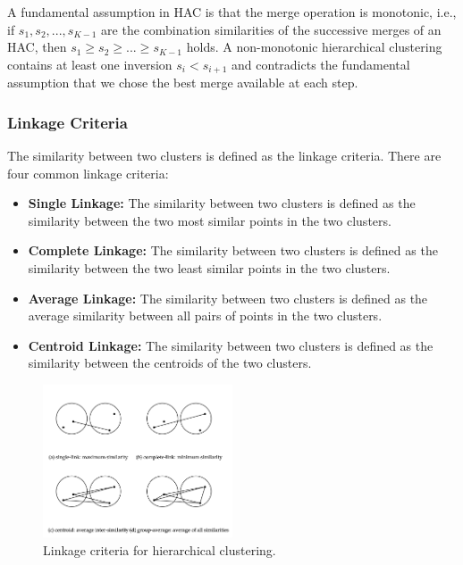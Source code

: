 \documentclass[conference]{IEEEtran}
\begin{document}
A fundamental assumption in HAC is that the merge operation is monotonic, i.e., if \( s_1, s_2, ..., s_{K-1} \) are the combination similarities of the successive merges of an HAC, then \( s_1 \geq s_2 \geq ... \geq s_{K-1} \) holds. A non-monotonic hierarchical clustering contains at least one inversion \( s_i < s_{i+1} \) and contradicts the fundamental assumption that we chose the best merge available at each step. \\

\subsubsection{Linkage Criteria} The similarity between two clusters is defined as the linkage criteria. There are four common linkage criteria:
\begin{itemize}
    \item \textbf{Single Linkage:} The similarity between two clusters is defined as the similarity between the two most similar points in the two clusters.
    \item \textbf{Complete Linkage:} The similarity between two clusters is defined as the similarity between the two least similar points in the two clusters.
    \item \textbf{Average Linkage:} The similarity between two clusters is defined as the average similarity between all pairs of points in the two clusters.
    \item \textbf{Centroid Linkage:} The similarity between two clusters is defined as the similarity between the centroids of the two clusters. \\
\end{itemize}

\begin{figure}[h]
    \centering
    \includegraphics[width=0.5\textwidth]{linkage_criteria.png}
    \caption{Linkage criteria for hierarchical clustering.}
    \label{fig:linkage_criteria}
\end{figure}
\end{document}
